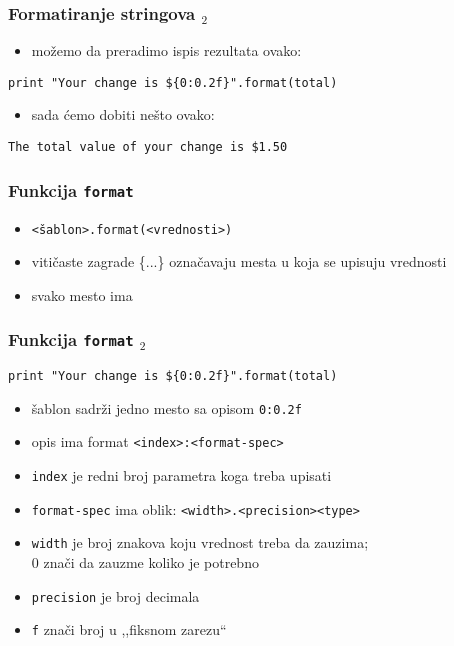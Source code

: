 \documentclass[utf8,compress]{beamer}
\begin{document}
\begin{frame}[fragile]
  \frametitle{Formatiranje stringova $_2$}
  \begin{itemize}
    \item možemo da preradimo ispis rezultata ovako:
  \end{itemize}
\begin{verbatim}
print "Your change is ${0:0.2f}".format(total)
\end{verbatim}
  \begin{itemize}
    \item sada ćemo dobiti nešto ovako:
  \end{itemize}
\begin{verbatim}
The total value of your change is $1.50
\end{verbatim}
\end{frame}

\begin{frame}[fragile]
  \frametitle{Funkcija \texttt{format}}
  \begin{itemize}
    \item \texttt{<šablon>.format(<vrednosti>)}
    \item vitičaste zagrade \{...\} označavaju mesta u koja se upisuju vrednosti
    \item svako mesto ima 
  \end{itemize}
\end{frame}

\begin{frame}[fragile]
  \frametitle{Funkcija \texttt{format} $_2$}
\begin{verbatim}
print "Your change is ${0:0.2f}".format(total)
\end{verbatim}
  \begin{itemize}
    \item šablon sadrži jedno mesto sa opisom \texttt{0:0.2f}
    \item opis ima format \texttt{<index>:<format-spec>}
    \item \texttt{index} je redni broj parametra koga treba upisati
    \item \texttt{format-spec} ima oblik: \texttt{<width>.<precision><type>}
    \item \texttt{width} je broj znakova koju vrednost treba da zauzima; \\0 znači da zauzme koliko je potrebno
    \item \texttt{precision} je broj decimala
    \item \texttt{f} znači broj u ,,fiksnom zarezu``
  \end{itemize}
\end{frame}
\end{document}
